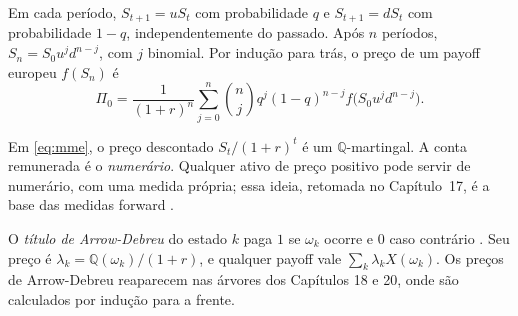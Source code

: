 \begin{definicao}
Em cada período, $S_{t+1}=uS_t$ com probabilidade $q$ e $S_{t+1}=dS_t$ com probabilidade $1-q$, independentemente do passado. Após $n$ períodos, $S_n=S_0u^jd^{n-j}$, com $j$ binomial. Por indução para trás, o preço de um payoff europeu $f(S_n)$ é
\begin{equation}\label{eq:binom-n}
\Pi_0=\frac{1}{(1+r)^n}\sum_{j=0}^n\binom nj q^j(1-q)^{n-j}f\big(S_0u^jd^{n-j}\big).
\end{equation}
\end{definicao}

\begin{observacao}
Em \eqref{eq:mme}, o preço descontado $S_t/(1+r)^t$ é um $\mathbb Q$-martingal. A conta remunerada é o \emph{numerário}. Qualquer ativo de preço positivo pode servir de numerário, com uma medida própria; essa ideia, retomada no Capítulo~17, é a base das medidas forward \citep{gemanetal1995}.
\end{observacao}

\begin{observacao}
O \emph{título de Arrow-Debreu} do estado $k$ paga $1$ se $\omega_k$ ocorre e $0$ caso contrário \citep{arrow1964}. Seu preço é $\lambda_k=\mathbb Q(\omega_k)/(1+r)$, e qualquer payoff vale $\sum_k\lambda_kX(\omega_k)$. Os preços de Arrow-Debreu reaparecem nas árvores dos Capítulos 18 e 20, onde são calculados por indução para a frente.
\end{observacao}
